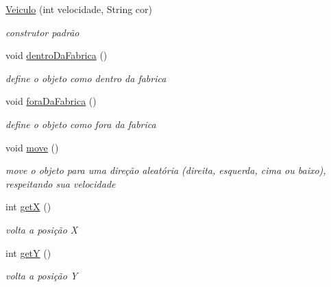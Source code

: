 \begin{DoxyCompactItemize}
\item 
\mbox{\hyperlink{class_veiculo_a6e43a5035741a90e4ef9d07b7fce6c87}{Veiculo}} (int velocidade, String cor)
\begin{DoxyCompactList}\small\item\em construtor padrão \end{DoxyCompactList}\item 
\mbox{\label{class_veiculo_a2bb3cf76255e4d6c33531daa82b1dfa7}} 
void \mbox{\hyperlink{class_veiculo_a2bb3cf76255e4d6c33531daa82b1dfa7}{dentro\+Da\+Fabrica}} ()
\begin{DoxyCompactList}\small\item\em define o objeto como dentro da fabrica \end{DoxyCompactList}\item 
\mbox{\label{class_veiculo_a72e8117111488e80a40e377327c361ea}} 
void \mbox{\hyperlink{class_veiculo_a72e8117111488e80a40e377327c361ea}{fora\+Da\+Fabrica}} ()
\begin{DoxyCompactList}\small\item\em define o objeto como fora da fabrica \end{DoxyCompactList}\item 
void \mbox{\hyperlink{class_veiculo_a3341b0ed6b4d34db990a31f7a499ae80}{move}} ()
\begin{DoxyCompactList}\small\item\em move o objeto para uma direção aleatória (direita, esquerda, cima ou baixo), respeitando sua velocidade \end{DoxyCompactList}\item 
\mbox{\label{class_veiculo_a235b29e1e25ec8c769b20fb2aeba8404}} 
int \mbox{\hyperlink{class_veiculo_a235b29e1e25ec8c769b20fb2aeba8404}{getX}} ()
\begin{DoxyCompactList}\small\item\em volta a posição X \end{DoxyCompactList}\item 
\mbox{\label{class_veiculo_a06b2a923e51186673a016f75d10363d3}} 
int \mbox{\hyperlink{class_veiculo_a06b2a923e51186673a016f75d10363d3}{getY}} ()
\begin{DoxyCompactList}\small\item\em volta a posição Y \end{DoxyCompactList}\item 

\end{DoxyCompactItemize}
